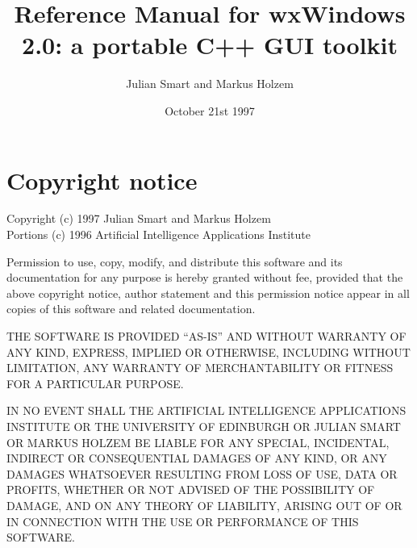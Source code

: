 \newcommand{\indexit}[1]{#1\index{#1}}
\newcommand{\pipe}[0]{$\|$\ }%



\parskip=10pt
\parindent=0pt
\title{Reference Manual for wxWindows 2.0: a portable C++ GUI toolkit}
\author{Julian Smart and Markus Holzem}
\date{October 21st 1997}

\makeindex

\maketitle

\pagestyle{fancyplain}

\setfooter{\thepage}{}{}{}{}{\thepage}
\tableofcontents


\chapter*{Copyright notice}
%
\setfooter{\thepage}{}{}{}{}{\thepage}

\begin{center}
Copyright (c) 1997 Julian Smart and Markus Holzem\\
Portions (c) 1996 Artificial Intelligence Applications Institute\\
\end{center}

Permission to use, copy, modify, and distribute this software and its
documentation for any purpose is hereby granted without fee, provided that the
above copyright notice, author statement and this permission notice appear in
all copies of this software and related documentation.

THE SOFTWARE IS PROVIDED ``AS-IS'' AND WITHOUT WARRANTY OF ANY KIND, EXPRESS,
IMPLIED OR OTHERWISE, INCLUDING WITHOUT LIMITATION, ANY WARRANTY OF
MERCHANTABILITY OR FITNESS FOR A PARTICULAR PURPOSE.

IN NO EVENT SHALL THE ARTIFICIAL INTELLIGENCE APPLICATIONS INSTITUTE OR THE
UNIVERSITY OF EDINBURGH OR JULIAN SMART OR MARKUS HOLZEM BE LIABLE FOR ANY SPECIAL, INCIDENTAL, INDIRECT OR
CONSEQUENTIAL DAMAGES OF ANY KIND, OR ANY DAMAGES WHATSOEVER RESULTING FROM
LOSS OF USE, DATA OR PROFITS, WHETHER OR NOT ADVISED OF THE POSSIBILITY OF
DAMAGE, AND ON ANY THEORY OF LIABILITY, ARISING OUT OF OR IN CONNECTION WITH
THE USE OR PERFORMANCE OF THIS SOFTWARE.

